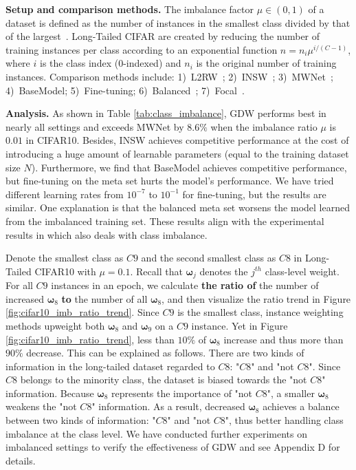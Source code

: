 \noindent \textbf{Setup and comparison methods.}
%
The imbalance factor $\mu \in (0, 1)$ of a dataset is defined as the number of instances in the smallest class divided by that of the largest~\cite{shuMetaWeightNetLearningExplicit2019a}.
%
Long-Tailed CIFAR \cite{krizhevskyLearningMultipleLayers2009} are created
by reducing the number of training instances per class according to an exponential function $n = n_i\mu^{i/(C-1)} $, where $i$ is the class index (0-indexed) and $n_i$ is the original number of training instances.
%
Comparison methods include: 1)~L2RW~\cite{renLearningReweightExamples2018}; 2)~INSW~\cite{huLearningDataManipulation2019a}; 3)~MWNet~\cite{shuMetaWeightNetLearningExplicit2019a}; 4)~BaseModel; 5)~Fine-tuning; 6)~Balanced~\cite{cuiClassBalancedLossBased2019}; 7)~Focal~\cite{linFocalLossDense2020}.

\noindent \textbf{Analysis.} As shown in Table \ref{tab:class_imbalance}, GDW performs best in nearly all settings and exceeds MWNet by $8.6\%$ when the imbalance ratio $\mu$ is $0.01$ in CIFAR10.
%
Besides, INSW achieves competitive performance at the cost of introducing a huge amount of learnable parameters (equal to the training dataset size $N$).
%
Furthermore, we find that BaseModel achieves competitive performance, but fine-tuning on the meta set hurts the model's performance.
%
We have tried different learning rates from $10^{-7}$ to $10^{-1}$ for fine-tuning, but the results are similar.
%
One explanation is that the balanced meta set worsens the model learned from the imbalanced training set.
%
These results align with the experimental results in \cite{huLearningDataManipulation2019a} which also deals with class imbalance.

%
Denote the smallest class as $C9$ and the second smallest class as $C8$ in Long-Tailed CIFAR10 with $\mu=0.1$.
%
Recall that $\boldsymbol \omega_j$ denotes the $j^{th}$ class-level weight.
%
For all $C9$ instances in an epoch, we calculate \textbf{the ratio of} the number of increased $\boldsymbol \omega_8$ \textbf{to} the number of all $\boldsymbol \omega_8$, and then visualize the ratio trend in Figure \ref{fig:cifar10_imb_ratio_trend}.
%
Since $C9$ is the smallest class, instance weighting methods upweight both $\boldsymbol \omega_8$ and $\boldsymbol \omega_9$ on a $C9$ instance.
%
Yet in Figure \ref{fig:cifar10_imb_ratio_trend}, less than $10\%$ of $\boldsymbol \omega_8$ increase and thus more than $90\%$
decrease.
%
This can be explained as follows.
%
There are two kinds of information in the long-tailed dataset regarded to $C8$: "$C8$" and "not $C8$".
%
Since $C8$ belongs to the minority class, the dataset is biased towards the "not $C8$" information.
%
Because $\boldsymbol \omega_8$ represents the importance of "not $C8$", a smaller $\boldsymbol \omega_8$ weakens the "not $C8$" information.
%
As a result, decreased $\boldsymbol \omega_8$ achieves a balance between two kinds of information: "$C8$" and "not $C8$", thus better handling class imbalance at the class level.
%
We have conducted further experiments on imbalanced settings to verify the effectiveness of GDW and see Appendix D for details.


